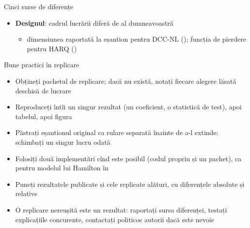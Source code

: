 \begin{frame}{Cinci surse de diferențe}
\begin{itemize}
\begin{itemize}
        \item fixed-$b$ (), testele de adecvare (), wild bootstrap ()
    \end{itemize}
    \item \textbf{Designul}: cadrul lucrării diferă de al dumneavoastră
    \begin{itemize}
        \item dimensiunea raportată la eșantion pentru DCC-NL (); funcția de pierdere pentru HARQ ()
    \end{itemize}
\end{itemize}
\end{frame}

\begin{frame}{Bune practici în replicare}
\itemsize{\small}
\begin{itemize}
    \item Obțineți pachetul de replicare; dacă nu există, notați fiecare alegere lăsată deschisă de lucrare
    \item Reproduceți întîi un singur rezultat (un coeficient, o statistică de test), apoi tabelul, apoi figura
    \item Păstrați eșantionul original ca rulare separată înainte de a-l extinde; schimbați un singur lucru odată
    \item Folosiți două implementări cînd este posibil (codul propriu și un pachet), ca pentru modelul lui Hamilton în 
    \item Puneți rezultatele publicate și cele replicate alături, cu diferențele absolute și relative
    \item O replicare nereușită este un rezultat: raportați sursa diferenței, testați explicațiile concurente, contactați politicos autorii dacă este nevoie
\end{itemize}
\end{frame}


